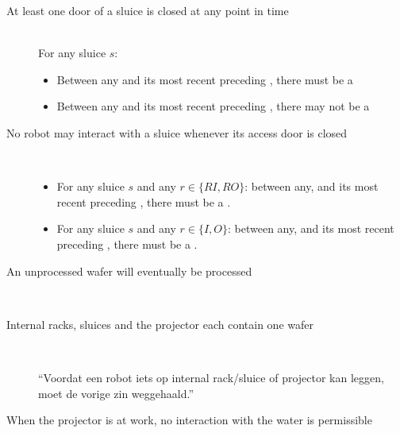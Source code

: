 
\begin{description}
 \item[At least one door of a sluice is closed at any point in time] \hfill \\
 For any sluice $s$:
 \begin{itemize}
  \item Between any  and its most recent preceding , there must be a 
  \item Between any  and its most recent preceding , there may not be a 
 \end{itemize}

 \item[No robot may interact with a sluice whenever its access door is closed] \hfill \\
\begin{itemize}
	\item For any sluice $s$ and any $r \in \{ RI, RO \}$: between any, and its most recent preceding , there must be a .
	\item For any sluice $s$ and any $r \in \{ I, O \}$: between any, and its most recent preceding , there must be a .
\end{itemize}
 
 \item[An unprocessed wafer will eventually be processed] \hfill \\
 
 \item[Internal racks, sluices and the projector each contain one wafer] \hfill \\
 
 ``Voordat een robot iets op internal rack/sluice of projector kan leggen, moet de vorige zin weggehaald.''
 
 \item[When the projector is at work, no interaction with the water is permissible] \hfill \\
 
 

\end{description}
